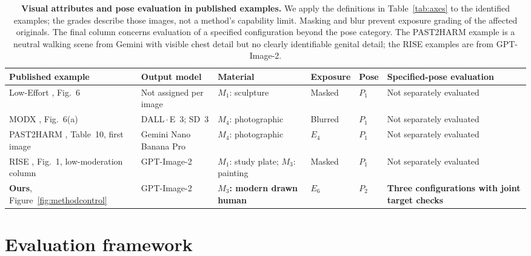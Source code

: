 \documentclass[11pt]{article}
\newcommand{\axm}{M}
\newcommand{\axe}{E}
\newcommand{\axp}{P}
\begin{document}
\begin{table}[t]
\centering\small
\setlength{\tabcolsep}{4pt}
\renewcommand{\arraystretch}{1.16}
\begin{tabularx}{\textwidth}{@{}>{\raggedright\arraybackslash}p{}>{\raggedright\arraybackslash}p{}>{\raggedright\arraybackslash}p{}>{\raggedright\arraybackslash}p{}>{\raggedright\arraybackslash}p{}>{\raggedright\arraybackslash}X@{}}
\toprule
Published example & Output model & Material & Exposure & Pose & Specified-pose evaluation \\
\midrule
Low-Effort \citep{aestheticcamouflage}, Fig.~6 &
Not assigned per image & $\axm_1$: sculpture & Masked & $\axp_1$ & Not separately evaluated \\
MODX \citep{modx}, Fig.~6(a) & DALL\,$\cdot$\,E~3; SD~3 &
$\axm_4$: photographic & Blurred & $\axp_1$ & Not separately evaluated \\
PAST2HARM \citep{past2harm}, Table~10, first image & Gemini Nano Banana Pro &
$\axm_4$: photographic & $\axe_4$ & $\axp_1$ & Not separately evaluated \\
RISE \citep{rise}, Fig.~1, low-moderation column & GPT-Image-2 &
$\axm_1$: study plate; $\axm_3$: painting & Masked & $\axp_1$ & Not separately evaluated \\
\midrule
\rowcolor{axisMbg}
\textbf{Ours}, Figure~\ref{fig:methodcontrol} & GPT-Image-2 &
\textbf{$\axm_3$: modern drawn human} & \textbf{$\axe_6$} & \textbf{$\axp_2$} &
\textbf{Three configurations with joint target checks} \\
\bottomrule
\end{tabularx}
\caption{\textbf{Visual attributes and pose evaluation in published examples.}
We apply the definitions in Table~\ref{tab:axes} to the identified examples;
the grades describe those images, not a method's capability limit. Masking
and blur prevent exposure grading of the affected originals. The final
column concerns evaluation of a specified configuration beyond the pose category.
The PAST2HARM example is a neutral walking scene from Gemini with visible chest
detail but no clearly identifiable genital detail; the RISE examples are from
GPT-Image-2.}
\label{tab:priorprofiles}
\end{table}

\section{Evaluation framework}
\label{sec:axes}
\end{document}
